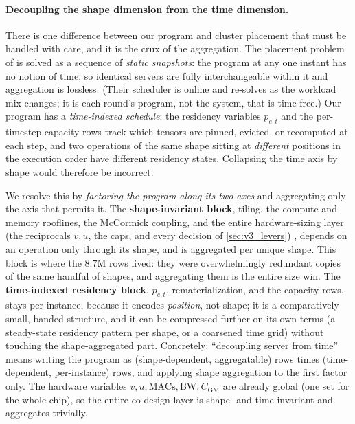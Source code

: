 \paragraph{Decoupling the shape dimension from the time dimension.}
There is one difference between our program and cluster placement that must be
handled with care, and it is the crux of the aggregation. The placement problem of
\citet{cvxcluster2026} is solved as a sequence of \emph{static snapshots}: the
program at any one instant has no notion of time, so identical servers are fully
interchangeable within it and aggregation is lossless. (Their scheduler is
online and re-solves as the workload mix changes; it is each round's program,
not the system, that is time-free.) Our
program has a \emph{time-indexed schedule}: the residency variables $p_{e,t}$ and
the per-timestep capacity rows track which tensors are pinned, evicted, or
recomputed at each step, and two operations of the same shape sitting at
\emph{different} positions in the execution order have different residency states.
Collapsing the time axis by shape would therefore be incorrect.

We resolve this by \emph{factoring the program along its two axes} and aggregating
only the axis that permits it. The \textbf{shape-invariant block}, tiling, the
compute and memory rooflines, the McCormick coupling, and the entire hardware-sizing
layer (the reciprocals $v,u$, the caps, and every decision of \cref{sec:v3_levers})
,  depends on an operation only through its shape, and is aggregated per unique
shape. This block is where the $8.7$M rows lived: they were overwhelmingly redundant
copies of the same handful of shapes, and aggregating them is the entire size win.
The \textbf{time-indexed residency block}, $p_{e,t}$, rematerialization, and the
capacity rows, stays per-instance, because it encodes \emph{position}, not shape;
it is a comparatively small, banded structure, and it can be compressed further on
its own terms (a steady-state residency pattern per shape, or a coarsened time grid)
without touching the shape-aggregated part. Concretely: ``decoupling server from
time'' means writing the program as (shape-dependent, aggregatable) rows times
(time-dependent, per-instance) rows, and applying shape aggregation to the first
factor only. The hardware variables $v,u,\mathrm{MACs},\mathrm{BW},C_{\mathrm{GM}}$
are already global (one set for the whole chip), so the entire co-design layer is
shape- and time-invariant and aggregates trivially.

